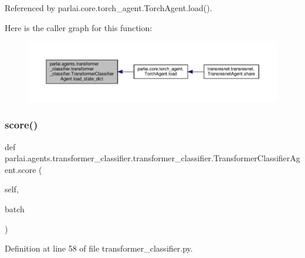 Referenced by parlai.\+core.\+torch\+\_\+agent.\+Torch\+Agent.\+load().

Here is the caller graph for this function\+:
\nopagebreak
\begin{figure}[H]
\begin{center}
\leavevmode
\includegraphics[width=350pt]{classparlai_1_1agents_1_1transformer__classifier_1_1transformer__classifier_1_1TransformerClassifierAgent_a2799356b935d49c3fa522f07428ff1c3_icgraph}
\end{center}
\end{figure}
\mbox{\label{classparlai_1_1agents_1_1transformer__classifier_1_1transformer__classifier_1_1TransformerClassifierAgent_a8d3cb4862ab598c8f93239255dd65eeb}} 
\subsubsection{\texorpdfstring{score()}{score()}}
{\footnotesize\ttfamily def parlai.\+agents.\+transformer\+\_\+classifier.\+transformer\+\_\+classifier.\+Transformer\+Classifier\+Agent.\+score (\begin{DoxyParamCaption}\item[{}]{self,  }\item[{}]{batch }\end{DoxyParamCaption})}



Definition at line 58 of file transformer\+\_\+classifier.\+py.



